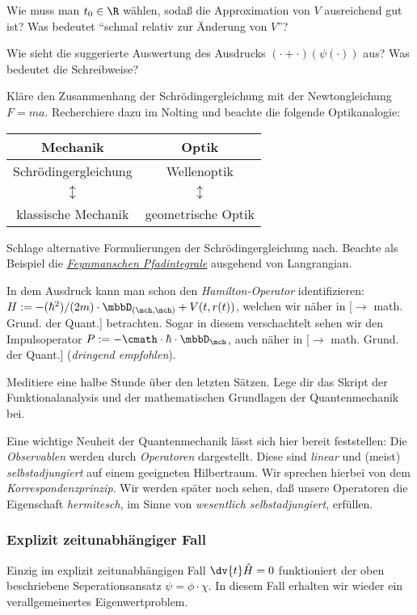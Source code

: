 \documentclass{subfiles}
\begin{document}
        \begin{Aufgabe}
            \nr{} Wie muss man $t_0\in\R$ wählen, sodaß die Approximation von $V$ ausreichend gut ist? Was bedeutet \enquote{schmal relativ zur Änderung von $V$}?

            \nr{} Wie sieht die suggerierte Auswertung des Ausdrucks $(\cdot +\cdot)(\psi(\cdot))$ aus? Was bedeutet die Schreibweise?

            \nr{} Kläre den Zusammenhang der Schrödingergleichung mit der Newtongleichung $F=ma$. Recherchiere dazu im Nolting und beachte die folgende Optikanalogie:
            \begin{table}[H]
                \centering
                \begin{tabular}{c|c}
                    \small{Mechanik} & \small{Optik} \\
                    \hline
                    \small{Schrödingergleichung} & 
                    \small{Wellenoptik} \\
                    \small{$\updownarrow$} & 
                    \small{$\updownarrow$} \\
                    \small{klassische Mechanik} & 
                    \small{geometrische Optik}
                \end{tabular}
            \end{table}

            \nr{} Schlage alternative Formulierungen der Schrödingergleichung nach. Beachte als Beispiel die \href{https://de.wikipedia.org/wiki/Pfadintegral}{\emph{Feynmanschen Pfadintegrale}} ausgehend von Langrangian. 
        \end{Aufgabe}
        In dem Ausdruck kann man schon den \emph{Hamilton-Operator} identifizieren: $H := -(\hbar^2)/(2m)\cdot\mbbD_{(\mch,\mch)}+V(t,r(t))$, welchen wir näher in [$\to$ math. Grund. der Quant.] betrachten. Sogar in diesem verschachtelt sehen wir den Impulsoperator $P :=-\cmath\cdot\hbar\cdot\mbbD_\mch$, auch näher in [$\to$ math. Grund. der Quant.] (\textit{dringend empfohlen}). 

        \begin{Aufgabe}
            \nr{} Meditiere eine halbe Stunde über den letzten Sätzen. Lege dir das Skript der Funktionalanalysis und der mathematischen Grundlagen der Quantenmechanik bei. 
        \end{Aufgabe}
        Eine wichtige Neuheit der Quantenmechanik lässt sich hier bereit feststellen: Die \emph{Observablen} werden durch \emph{Operatoren} dargestellt. Diese sind \emph{linear} und (meist) \emph{selbstadjungiert} auf einem geeigneten Hilbertraum. Wir sprechen hierbei von dem \emph{Korrespondenzprinzip}. Wir werden später noch sehen, daß unsere Operatoren die Eigenschaft \emph{hermitesch}, im Sinne von \emph{wesentlich selbstadjungiert}, erfüllen. 

        \subsubsection*{Explizit zeitunabhängiger Fall}
            Einzig im explizit zeitunabhängigen Fall $\dv{t}\hat H = 0$ funktioniert der oben beschriebene Seperationsansatz $\psi = \phi\cdot\chi$. In diesem Fall erhalten wir wieder ein verallgemeinertes Eigenwertproblem. 
\end{document}
